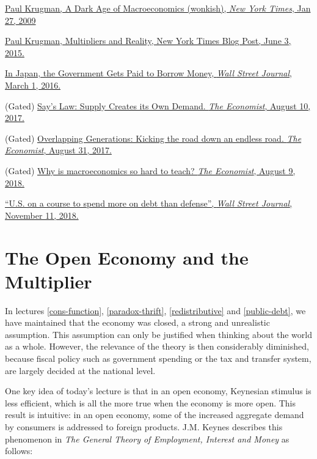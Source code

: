 \documentclass[]{book}
\theoremstyle{definition}
\theoremstyle{definition}
\theoremstyle{definition}
\theoremstyle{remark}
\begin{document}
\href{https://search.proquest.com/docview/1930920374/1A771BC8177A4FB7PQ/1?accountid=14512}{Paul
Krugman, A Dark Age of Macroeconomics (wonkish), \emph{New York Times},
Jan 27, 2009}

\href{https://krugman.blogs.nytimes.com/2015/06/03/multipliers-and-reality/}{Paul
Krugman, Multipliers and Reality, New York Times Blog Post, June 3,
2015.}

\href{https://search.proquest.com/docview/1768757479/E1052F8FA6974859PQ/1?accountid=14512}{In
Japan, the Government Gets Paid to Borrow Money, \emph{Wall Street
Journal}, March 1, 2016.}

(Gated)
\href{https://www.economist.com/economics-brief/2017/08/10/says-law-supply-creates-its-own-demand}{Say's
Law: Supply Creates its Own Demand. \emph{The Economist}, August 10,
2017.}

(Gated)
\href{https://www.economist.com/economics-brief/2017/08/31/kicking-the-can-down-an-endless-road}{Overlapping
Generations: Kicking the road down an endless road. \emph{The
Economist}, August 31, 2017.}

(Gated)
\href{https://www.economist.com/finance-and-economics/2018/08/09/why-is-macroeconomics-so-hard-to-teach}{Why
is macroeconomics so hard to teach? \emph{The Economist}, August 9,
2018.}

\href{https://search.proquest.com/docview/2131663609/B6DB7A44958C4606PQ/1?accountid=14512}{``U.S.
on a course to spend more on debt than defense'', \emph{Wall Street
Journal}, November 11, 2018.}

\chapter{The Open Economy and the Multiplier}\label{open}

In lectures \ref{cons-function}, \ref{paradox-thrift},
\ref{redistributive} and \ref{public-debt}, we have maintained that the
economy was closed, a strong and unrealistic assumption. This assumption
can only be justified when thinking about the world as a whole. However,
the relevance of the theory is then considerably diminished, because
fiscal policy such as government spending or the tax and transfer
system, are largely decided at the national level.

One key idea of today's lecture is that in an open economy, Keynesian
stimulus is less efficient, which is all the more true when the economy
is more open. This result is intuitive: in an open economy, some of the
increased aggregate demand by consumers is addressed to foreign
products. J.M. Keynes describes this phenomenon in \emph{The General
Theory of Employment, Interest and Money} as follows:
\end{document}
